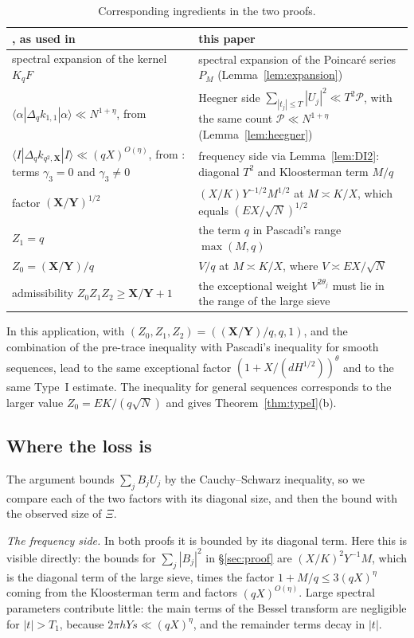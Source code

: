 \documentclass[11pt]{amsart}
\theoremstyle{remark}
\theoremstyle{definition}
\numberwithin{equation}{section}
\newcommand{\Pc}{\mathcal{P}}
\newcommand{\bX}{\mathbf{X}}
\newcommand{\bY}{\mathbf{Y}}
\newcommand{\br}[1]{\langle #1\rangle}
\begin{document}
\begin{table}[h]
\centering
\small
\begin{tabularx}{\textwidth}{@{}XX@{}}
\toprule
\cite[Theorem~8.1]{GM1}, as used in \cite[\S6]{II} & this paper\\
\midrule
spectral expansion of the kernel $K_qF$ & spectral expansion of the Poincar\'e series $P_M$ (Lemma~\ref{lem:expansion})\\
$\br{\alpha|\Delta_qk_{1,1}|\alpha}\ll N^{1+\eta}$, from \cite[Lemma~6.4]{II} & Heegner side $\sum_{|t_j|\le T}|U_j|^2\ll T^2\Pc$, with the same count $\Pc\ll N^{1+\eta}$ (Lemma~\ref{lem:heegner})\\
$\br{I|\Delta_qk_{q^2,\bX}|I}\ll(qX)^{O(\eta)}$, from \cite[Lemma~6.3]{II}: terms $\gamma_3=0$ and $\gamma_3\ne0$ & frequency side via Lemma~\ref{lem:DI2}: diagonal $T^2$ and Kloosterman term $M/q$\\
factor $(\bX/\bY)^{1/2}$ & $(X/K)Y^{-1/2}M^{1/2}$ at $M\asymp K/X$, which equals $(EX/\sqrt N)^{1/2}$\\
$Z_1=q$ & the term $q$ in Pascadi's range $\max(M,q)$\\
$Z_0=(\bX/\bY)/q$ & $V/q$ at $M\asymp K/X$, where $V\asymp EX/\sqrt N$\\
admissibility $Z_0Z_1Z_2\ge\bX/\bY+1$ & the exceptional weight $V^{2\theta_j}$ must lie in the range of the large sieve\\
\bottomrule
\end{tabularx}
\caption{Corresponding ingredients in the two proofs.}
\label{tab:dictionary}
\end{table}

In this application, \cite[Theorem~8.1]{GM1} with $(Z_0,Z_1,Z_2)=((\bX/\bY)/q,q,1)$, and the combination of the pre-trace inequality with Pascadi's inequality for smooth sequences, lead to the same exceptional factor $(1+X/(dH^{1/2}))^\theta$ and to the same Type~I estimate. The inequality \cite[Theorem~5]{DI} for general sequences corresponds to the larger value $Z_0=EK/(q\sqrt N)$ and gives Theorem~\ref{thm:typeI}(b).

\subsection{Where the loss is}\label{sec:loss}
The argument bounds $\sum_jB_jU_j$ by the Cauchy--Schwarz inequality, so we compare each of the two factors with its diagonal size, and then the bound with the observed size of $\Xi$.

\emph{The frequency side.} In both proofs it is bounded by its diagonal term. Here this is visible directly: the bounds for $\sum_j|B_j|^2$ in \S\ref{sec:proof} are $(X/K)^2Y^{-1}M$, which is the diagonal term of the large sieve, times the factor $1+M/q\le3(qX)^\eta$ coming from the Kloosterman term and factors $(qX)^{O(\eta)}$. Large spectral parameters contribute little: the main terms of the Bessel transform are negligible for $|t|>T_1$, because $2\pi hYs\ll(qX)^\eta$, and the remainder terms decay in $|t|$.
\end{document}

